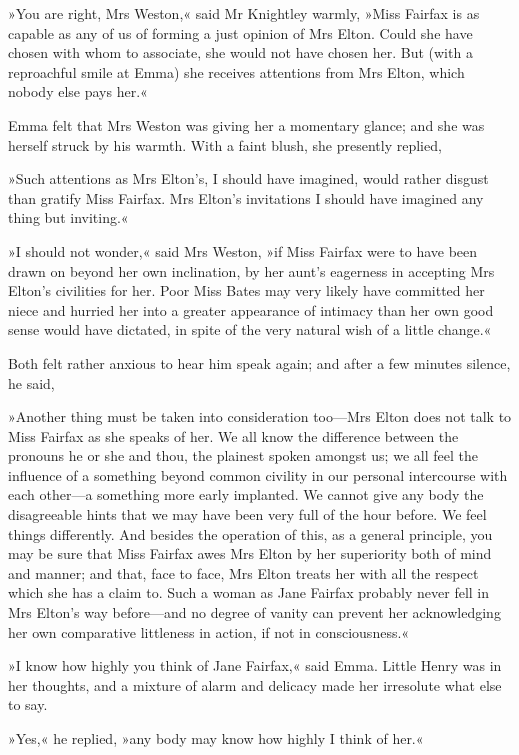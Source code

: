 »You are right, Mrs Weston,« said Mr Knightley warmly, »Miss Fairfax is as capable as any of us of forming a just opinion of Mrs Elton. Could she have chosen with whom to associate, she would not have chosen her. But (with a reproachful smile at Emma) she receives attentions from Mrs Elton, which nobody else pays her.«

Emma felt that Mrs Weston was giving her a momentary glance; and she was herself struck by his warmth. With a faint blush, she presently replied,

»Such attentions as Mrs Elton's, I should have imagined, would rather disgust than gratify Miss Fairfax. Mrs Elton's invitations I should have imagined any thing but inviting.«

»I should not wonder,« said Mrs Weston, »if Miss Fairfax were to have been drawn on beyond her own inclination, by her aunt's eagerness in accepting Mrs Elton's civilities for her. Poor Miss Bates may very likely have committed her niece and hurried her into a greater appearance of intimacy than her own good sense would have dictated, in spite of the very natural wish of a little change.«

Both felt rather anxious to hear him speak again; and after a few minutes silence, he said,

»Another thing must be taken into consideration too—Mrs Elton does not talk to Miss Fairfax as she speaks of her. We all know the difference between the pronouns he or she and thou, the plainest spoken amongst us; we all feel the influence of a something beyond common civility in our personal intercourse with each other—a something more early implanted. We cannot give any body the disagreeable hints that we may have been very full of the hour before. We feel things differently. And besides the operation of this, as a general principle, you may be sure that Miss Fairfax awes Mrs Elton by her superiority both of mind and manner; and that, face to face, Mrs Elton treats her with all the respect which she has a claim to. Such a woman as Jane Fairfax probably never fell in Mrs Elton's way before—and no degree of vanity can prevent her acknowledging her own comparative littleness in action, if not in consciousness.«

»I know how highly you think of Jane Fairfax,« said Emma. Little Henry was in her thoughts, and a mixture of alarm and delicacy made her irresolute what else to say.

»Yes,« he replied, »any body may know how highly I think of her.«

